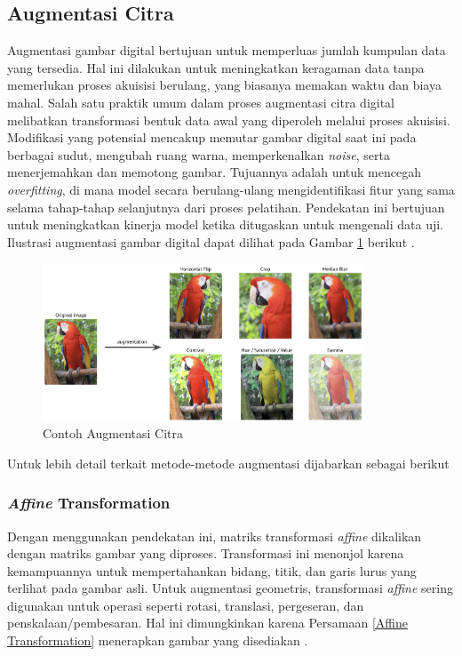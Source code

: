 \subsection{Augmentasi Citra }

    Augmentasi gambar digital bertujuan untuk memperluas jumlah kumpulan data yang tersedia. Hal ini dilakukan untuk meningkatkan keragaman data tanpa memerlukan proses akuisisi berulang, yang biasanya memakan waktu dan biaya mahal. Salah satu praktik umum dalam proses augmentasi citra digital melibatkan transformasi bentuk data awal yang diperoleh melalui proses akuisisi. Modifikasi yang potensial mencakup memutar gambar digital saat ini pada berbagai sudut, mengubah ruang warna, memperkenalkan \textit{noise}, serta menerjemahkan dan memotong gambar. Tujuannya adalah untuk mencegah \textit{overfitting}, di mana model secara berulang-ulang mengidentifikasi fitur yang sama selama tahap-tahap selanjutnya dari proses pelatihan. Pendekatan ini bertujuan untuk meningkatkan kinerja model ketika ditugaskan untuk mengenali data uji. Ilustrasi augmentasi gambar digital dapat dilihat pada Gambar \ref{Contoh Augmentasi Citra} berikut \cite{Shorten2019, shorten2019survey}.

    
    \begin{figure}[H]
      \centering
      \includegraphics[width=0.85\textwidth]{figures/bab2/augmentation.jpg}
      \caption{Contoh Augmentasi Citra \cite{info11020125}}
      \label{Contoh Augmentasi Citra}
    \end{figure}


    Untuk lebih detail terkait metode-metode augmentasi dijabarkan sebagai berikut

    \subsubsection{\textit{Affine} Transformation}

    
        Dengan menggunakan pendekatan ini, matriks transformasi \textit{affine} dikalikan dengan matriks 
        gambar yang diproses. Transformasi ini menonjol karena kemampuannya untuk mempertahankan bidang, 
        titik, dan garis lurus yang terlihat pada gambar asli. Untuk augmentasi geometris, 
        transformasi \textit{affine} sering digunakan untuk operasi seperti rotasi, translasi, 
        pergeseran, dan penskalaan/pembesaran. Hal ini dimungkinkan karena Persamaan \ref{Affine Transformation} 
        menerapkan gambar yang disediakan \cite{Gonzalez2009}.

